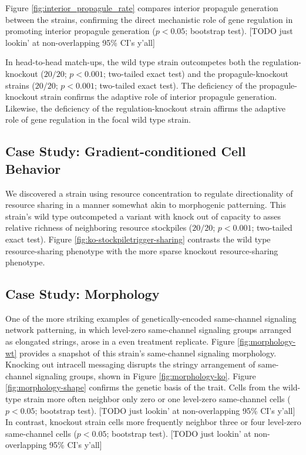 Figure \ref{fig:interior_propagule_rate} compares interior propagule generation between the strains, confirming the direct mechanistic role of gene regulation in promoting interior propagule generation ($p < 0.05$; bootstrap test).
[TODO just lookin' at non-overlapping 95\% CI's y'all]

In head-to-head match-ups, the wild type strain outcompetes both the regulation-knockout ($20/20$; $p < 0.001$; two-tailed exact test) and the propagule-knockout strains
($20/20$; $p < 0.001$; two-tailed exact test).
The deficiency of the propagule-knockout strain confirms the adaptive role of interior propagule generation.
Likewise, the deficiency of the regulation-knockout strain affirms the adaptive role of gene regulation in the focal wild type strain.

\subsection{Case Study: Gradient-conditioned Cell Behavior} \label{sec:gradient-conditioned-behavior}



We discovered a strain using resource concentration to regulate directionality of resource sharing in a manner somewhat akin to morphogenic patterning.
This strain's wild type outcompeted a variant with knock out of capacity to asses relative richness of neighboring resource stockpiles ($20/20$; $p < 0.001$; two-tailed exact test).
Figure \ref{fig:ko-stockpiletrigger-sharing} contrasts the wild type resource-sharing phenotype  with the more sparse knockout resource-sharing phenotype.

\subsection{Case Study: Morphology} \label{sec:morphology}



One of the more striking examples of genetically-encoded same-channel signaling network patterning, in which level-zero same-channel signaling groups arranged as elongated strings, arose in a even treatment replicate.
Figure \ref{fig:morphology-wt} provides a snapshot of this strain's same-channel signaling morphology.
Knocking out intracell messaging disrupts the stringy arrangement of same-channel signaling groups, shown in Figure \ref{fig:morphology-ko}.
Figure \ref{fig:morphology-shape} confirms the genetic basis of the trait.
Cells from the wild-type strain more often neighbor only zero or one level-zero same-channel cells ($p < 0.05$; bootstrap test).
[TODO just lookin' at non-overlapping 95\% CI's y'all]
In contrast, knockout strain cells more frequently neighbor three or four level-zero same-channel cells ($p < 0.05$; bootstrap test).
[TODO just lookin' at non-overlapping 95\% CI's y'all]

